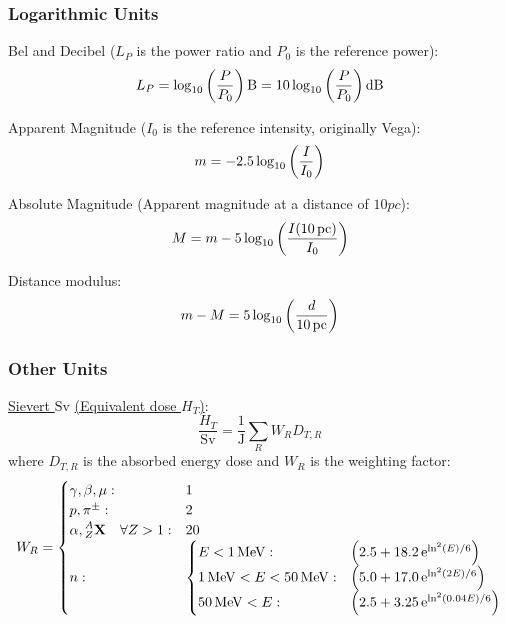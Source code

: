 		\subsubsection{Logarithmic Units}
			\noindent
			Bel and Decibel ($L_P$ is the power ratio and $P_0$ is the reference power):
			\begin{equation}
				L_P = \log_{10}\qty(\frac{P}{P_0})\,\mathrm{B}
				=10\log_{10}\qty(\frac{P}{P_0})\,\mathrm{dB}
			\end{equation}

			\noindent
			Apparent Magnitude ($I_0$ is the reference intensity, originally Vega):
			\begin{equation}
				m = -2.5 \log_{10} \qty( \frac{I}{I_0} )
			\end{equation}

			\noindent
			Absolute Magnitude (Apparent magnitude at a distance of $10\unit{pc}$):
			\begin{equation}
				M = m - 5 \log_{10} \qty( \frac{I(10\,\mathrm{pc})}{I_0} )
			\end{equation}

			\noindent
			Distance modulus:
			\begin{equation}
				m - M = 5 \log_{10} \qty( \frac{d}{10\,\mathrm{pc}} )
			\end{equation}

		\subsubsection{Other Units}
			\href{https://en.wikipedia.org/wiki/Sievert}{Sievert $\mathrm{Sv}$} \href{https://en.wikipedia.org/wiki/Equivalent_dose}{(Equivalent dose $H_T$)}:
			\begin{equation}
				\frac{H_T}{\mathrm{Sv}} = \frac{1}{\mathrm{J}}\sum_R W_R D_{T,R}
			\end{equation}
			where $D_{T,R}$ is the absorbed energy dose and $W_R$ is the weighting factor:
			\begin{equation}
				\begin{aligned}
					W_R =
					\begin{cases}
						\gamma,\beta,\mu: & 1 \\
						p, \pi^\pm: & 2 \\
						\alpha, \prescript{A}{Z}{\mathbf{X}}\quad\forall Z>1: & 20 \\
						n: &\begin{cases}
							E<1\,\mathrm{MeV}: & \qty(2.5+18.2 \,\mathrm{e}^{\ln^2(E)/6}) \\
							1\,\mathrm{MeV} <E<50\,\mathrm{MeV}: & \qty(5.0+17.0 \,\mathrm{e}^{\ln^2(2E)/6}) \\
							50\,\mathrm{MeV}<E: & \qty(2.5+3.25 \,\mathrm{e}^{\ln^2(0.04E)/6}) \\
						\end{cases}
					\end{cases}\\
				\end{aligned}
			\end{equation}

